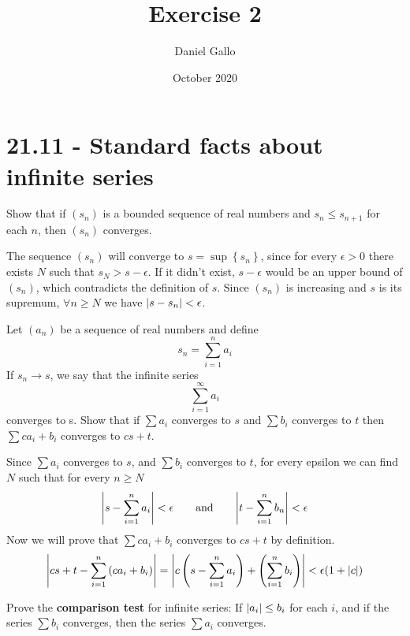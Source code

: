 \documentclass{article}
\title{Exercise 2}
\author{Daniel Gallo}
\date{October 2020}
\DeclarePairedDelimiter\abs{\lvert}{\rvert}%
\begin{document}
    \maketitle
    \section*{21.11 - Standard facts about infinite series}
    \begin{tcolorbox}[title=Exercise a]
        \label{21.11a}
        Show that if $(s_n)$ is a bounded sequence of real numbers and $s_n \leq s_{n + 1}$ for each $n$, then $(s_n)$ converges.
    \end{tcolorbox}
    \noindent
    The sequence $(s_n)$ will converge to $s = \sup\left\{s_n\right\}$, since for every $\epsilon > 0$ there exists $N$ such that $s_N > s - \epsilon$. If it didn't exist, $s - \epsilon$ would be an upper bound of $(s_n)$, which contradicts the definition of $s$. Since $(s_n)$ is increasing and $s$ is its supremum, $\forall n \geq N$ we have $\abs{s - s_n} < \epsilon$.
    \begin{tcolorbox}[title=Exercise b]
        \label{21.11b}
        Let $(a_n)$ be a sequence of real numbers and define
        \begin{equation*}
            s_n = \sum_{i=1}^n{a_i}
        \end{equation*}
        If $s_n \rightarrow s$, we say that the infinite series
        \begin{equation*}
            \sum_{i=1}^\infty{a_i}
        \end{equation*}
        converges to s. Show that if $\sum{a_i}$ converges to $s$ and $\sum{b_i}$ converges to $t$ then $\sum{ca_i + b_i}$ converges to $cs + t$.
    \end{tcolorbox}
    \noindent
    Since $\sum{a_i}$ converges to $s$, and $\sum{b_i}$ converges to $t$, for every epsilon we can find $N$ such that for every $n \geq N$
    \begin{equation*}
        \abs*{s - \sum_{i=1}^n{a_i}} < \epsilon \qquad \text{and} \qquad \abs*{t - \sum_{i=1}^n{b_n}} < \epsilon
    \end{equation*}
    Now we will prove that $\sum{ca_i + b_i}$ converges to $cs + t$ by definition.
    \begin{equation*}
        \abs*{cs+t - \sum_{i=1}^n{\left(ca_i + b_i\right)}} = \abs*{c\left(s - \sum_{i=1}^n{a_i}\right) + \left(\sum_{i=1}^n{b_i}\right)} < \epsilon(1 + \abs{c})
    \end{equation*}
    \begin{tcolorbox}[title=Exercise c]
        \label{21.11c}
        Prove the \textbf{comparison test} for infinite series: If $\abs{a_i} \leq b_i$ for each $i$, and if the series $\sum{b_i}$ converges, then the series $\sum{a_i}$ converges.
    \end{tcolorbox}
\end{document}
